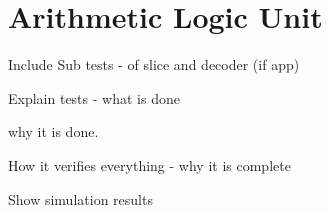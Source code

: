 
\section{Arithmetic Logic Unit}

Include Sub tests - of slice and decoder (if app)

Explain tests - what is done

why it is done.

How it verifies everything - why it is complete

Show simulation results

